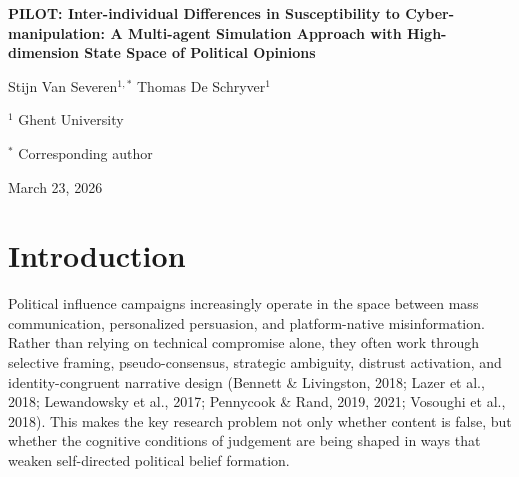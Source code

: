 \documentclass[11pt]{article}
\begin{document}
\begin{center}
{\LARGE\bfseries PILOT: Inter-individual Differences in Susceptibility to Cyber-manipulation: A Multi-agent Simulation Approach with High-dimension State Space of Political Opinions\par}
\vspace{0.8em}
{\large Stijn Van Severen$^{1,*}$ \quad Thomas De Schryver$^1$\par}
\vspace{0.35em}
{\normalsize $^1$ Ghent University\par}
{\normalsize $^*$ Corresponding author\par}
\vspace{0.35em}
{\normalsize March 23, 2026\par}
\end{center}

\begin{abstract}
This pilot examines how inter-individual differences moderate the effectivity of cyber-manipulation on political opinions using an ontology-driven multi-agent simulation pipeline. Run 6 uses an attacked-only profile-panel design in which one fixed misinformation leaf is applied to each pseudoprofile across multiple political-opinion leaves. Attack effectivity is defined as within-profile post-minus-baseline movement, with absolute shift $A_{ik} = |\text{post}_{ik} - \text{baseline}_{ik}|$ as the primary outcome so that issue-specific signed movements do not cancel out. The pilot generated 100 pseudoprofiles, 400 attacked opinion rows, and 4 repeated attacked outcomes per profile. Mean absolute attacked shift was 43.35, mean signed shift was 22.86, mean attack realism was 0.71, and mean post-exposure plausibility was 0.73. The structural model is now a repeated-outcome path SEM in which multiple attacked opinion deltas are regressed on profile moderators simultaneously. To compute a profile-level susceptibility summary without inheriting multicollinearity from a small-sample OLS, a cross-validated ridge aggregation is fit after the run and converted into a post hoc empirical susceptibility index. The pilot should therefore be read as methodological validation and exploratory evidence rather than as claim-ready causal estimation.
\end{abstract}

\section{Introduction}
Political influence campaigns increasingly operate in the space between mass communication, personalized persuasion, and platform-native misinformation. Rather than relying on technical compromise alone, they often work through selective framing, pseudo-consensus, strategic ambiguity, distrust activation, and identity-congruent narrative design (Bennett \& Livingston, 2018; Lazer et al., 2018; Lewandowsky et al., 2017; Pennycook \& Rand, 2019, 2021; Vosoughi et al., 2018). This makes the key research problem not only whether content is false, but whether the cognitive conditions of judgement are being shaped in ways that weaken self-directed political belief formation.
\end{document}
